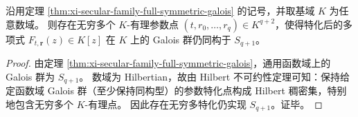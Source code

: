 \begin{corollary}[满对称算术特化的无穷多性]\label{cor:xi-secular-specialization-infinitely-many-full-symmetric}
沿用定理 \ref{thm:xi-secular-family-full-symmetric-galois} 的记号，并取基域 \(K\) 为任意数域。
则存在无穷多个 \(K\)-有理参数点 \((t,r_0,\dots,r_q)\in K^{q+2}\)，使得特化后的多项式 \(F_{t,\mathbf r}(z)\in K[z]\) 在 \(K\) 上的 Galois 群仍同构于 \(S_{q+1}\)。
\end{corollary}
\begin{proof}
由定理 \ref{thm:xi-secular-family-full-symmetric-galois}，通用函数域上的 Galois 群为 \(S_{q+1}\)。
数域为 Hilbertian，故由 Hilbert 不可约性定理可知：保持给定函数域 Galois 群（至少保持同构型）的参数特化点构成 Hilbert 稠密集，特别地包含无穷多个 \(K\)-有理点。
因此存在无穷多特化仍实现 \(S_{q+1}\)。证毕。
\end{proof}

\endinput

